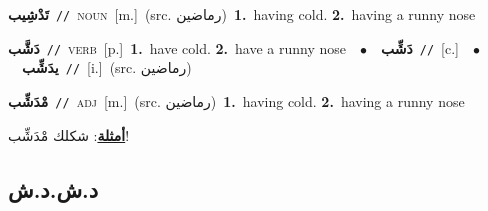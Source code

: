 \documentclass[10pt,a4paper,twoside]{article} %
\begin{document}
\begin{multicols}{2}
{\setlength\topsep{0pt}\textbf{\foreignlanguage{arabic}{تَدْشِيب}}\ {\color{gray}\texttt{//}\color{black}}\ \textsc{noun}\ [m.]\ (src. \color{gray}\foreignlanguage{arabic}{رماضين}\color{black})\ \textbf{1.}~having cold.  \textbf{2.}~having a runny nose\ } \vspace{2mm}

{\setlength\topsep{0pt}\textbf{\foreignlanguage{arabic}{دَشَّب}}\ {\color{gray}\texttt{//}\color{black}}\ \textsc{verb}\ [p.]\ \textbf{1.}~have cold.  \textbf{2.}~have a runny nose\ \ $\bullet$\ \ \setlength\topsep{0pt}\textbf{\foreignlanguage{arabic}{دَشِّب}}\ {\color{gray}\texttt{//}\color{black}}\ [c.]\ \ $\bullet$\ \ \setlength\topsep{0pt}\textbf{\foreignlanguage{arabic}{يدَشِّب}}\ {\color{gray}\texttt{//}\color{black}}\ [i.]\ (src. \color{gray}\foreignlanguage{arabic}{رماضين}\color{black})\ } \vspace{2mm}

{\setlength\topsep{0pt}\textbf{\foreignlanguage{arabic}{مْدَشِّب}}\ {\color{gray}\texttt{//}\color{black}}\ \textsc{adj}\ [m.]\ (src. \color{gray}\foreignlanguage{arabic}{رماضين}\color{black})\ \textbf{1.}~having cold.  \textbf{2.}~having a runny nose\  \begin{flushright}\color{gray}\foreignlanguage{arabic}{\textbf{\underline{\foreignlanguage{arabic}{أمثلة}}}: شكلك مْدَشِّب!}\end{flushright}\color{black}} \vspace{2mm}

\vspace{-3mm}
\subsection*{\color{blue}\foreignlanguage{arabic}{د.ش.د.ش}\color{blue}{}} 


\end{multicols}
\end{document}
